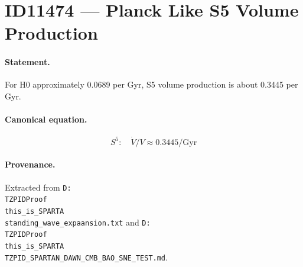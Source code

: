 \section*{ID11474 --- Planck Like S5 Volume Production}

\paragraph{Statement.}
For H0 approximately 0.0689 per Gyr, S5 volume production is about 0.3445 per Gyr.

\paragraph{Canonical equation.}
\[
S^5:\quad\dot V/V\approx0.3445/\mathrm{Gyr}
\]

\paragraph{Provenance.}
Extracted from \texttt{D:\\TZPIDProof\\this\_is\_SPARTA\\standing\_wave\_expaansion.txt} and \texttt{D:\\TZPIDProof\\this\_is\_SPARTA\\TZPID\_SPARTAN\_DAWN\_CMB\_BAO\_SNE\_TEST.md}.
